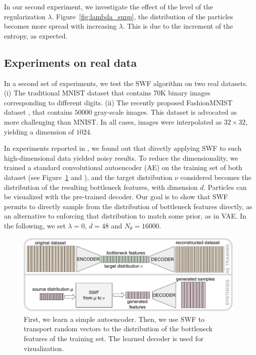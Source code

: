 

In our second experiment, we investigate the effect of the level of the regularization $\lambda$. Figure~\ref{fig:lambda_supp}, the distribution of the particles becomes more spread with increasing $\lambda$. This is due to the increment of the entropy, as expected.

\subsection{Experiments on real data}

In a second set of experiments, we test the SWF algorithm on two real datasets. (i) The traditional MNIST dataset that contains 70K binary images corresponding to different digits. (ii) The recently proposed FashionMNIST dataset \cite{xiao2017fashion}, that contains $50000$ gray-scale images. This dataset is advocated as more challenging than MNIST. In all cases, images were interpolated as $32\times 32$, yielding a dimension of $1024$.

In experiments reported in \supp, we found out that directly applying SWF to such high-dimensional data yielded noisy results. To reduce the dimensionality, we trained a standard convolutional autoencoder (AE) on the training set of both dataset (see Figure~\ref{fig:using_ae} and \supp), and the target distribution $\nu$ considered becomes the distribution of the resulting bottleneck features,
with dimension $d$. Particles can be visualized with the pre-trained decoder.
Our goal is to show that SWF permits to directly sample from the distribution of bottleneck features directly, as an alternative to enforcing that distribution to match some prior, as in VAE. In the following, we set $\lambda=0$, $d=48$ and $N_\theta=16000$.

\begin{figure}
\centering
\includegraphics[width=0.99\columnwidth]{figures/generating_bottleneck_features.pdf}
\caption{First, we learn a simple autoencoder. Then, we use SWF to transport random vectors to the distribution of the bottleneck features of the training set. The learned decoder is used for vizualization.}
\label{fig:using_ae}
\vspace{-10pt}
\end{figure}


